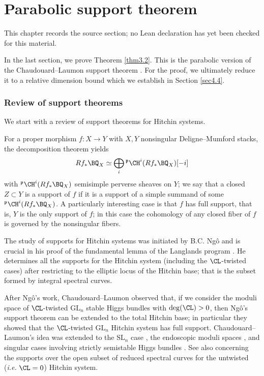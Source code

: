 \chapter{Parabolic support theorem}
\label{pw-conjecture-gl-n-chapter-05}

\begin{remark}
\label{pw-conjecture-gl-n-chapter-05-source}
This chapter records the source section; no Lean declaration has yet been checked for this material.
\notready
\end{remark}

In the last section, we prove Theorem \ref{thm3.2}. This is the parabolic version of the Chaudouard--Laumon support theorem \cite{CL}. For the proof, we ultimately reduce it to a relative dimension bound which we establish in Section \ref{sec4.4}.

\subsection{Review of support theorems}\label{Sec4.1}

We start with a review of support theorems for Hitchin systems.

For a proper morphism $f: X\to Y$ with $X,Y$ nonsingular Deligne--Mumford stacks, the decomposition theorem \cite{BBD} yields
\[
Rf_* \BQ_X \simeq \bigoplus_i {^\mathfrak{p}\CH^i(Rf_* \BQ_X)[-i]}
\]
with ${^\mathfrak{p}\CH^i}(Rf_* \BQ_X)$ semisimple perverse sheaves on $Y$; we say that a closed $Z \subset Y$ is a support of $f$ if it is a support of a simple summand of some ${^\mathfrak{p}\CH^i}(Rf_* \BQ_X)$. A particularly interesting case is that $f$ has full support, that is, $Y$ is the only support of $f$; in this case the cohomology of any closed fiber of $f$ is governed by the nonsingular fibers.

The study of supports for Hitchin systems was initiated by B.C. Ng\^o and is crucial in his proof of the fundamental lemma of the Langlands program \cite{Ngo}. He determines all the supports for the Hitchin system (including the $\CL$-twisted cases) after restricting to the elliptic locus of the Hitchin base; that is the subset formed by integral spectral curves.

After Ng\^o's work, Chaudouard--Laumon \cite{CL} observed that, if we consider the moduli space of $\CL$-twisted $\mathrm{GL}_n$ stable Higgs bundles with $\mathrm{deg}(\CL) >0$, then Ng\^o's support theorem can be extended to the total Hitchin base; in particular they showed that the $\CL$-twisted $\mathrm{GL}_n$ Hitchin system has full support. Chaudouard--Laumon's idea was extended to the $\mathrm{SL}_n$ case \cite{dC_SL}, the endoscopic moduli spaces \cite{MS}, and singular cases involving strictly semistable Higgs bundles \cite{MS2,MS3}. See also \cite{dCHM2,MM} concerning the supports over the open subset of reduced spectral curves for the untwisted (\emph{i.e.} $\CL = 0$) Hitchin system.

